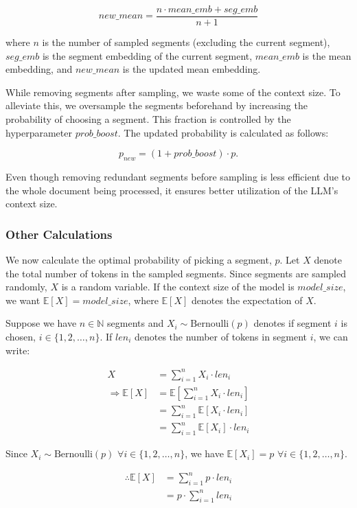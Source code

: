 \[ new\_mean = \frac{n \cdot mean\_emb + seg\_emb}{n + 1} \]

\noindent where $n$ is the number of sampled segments (excluding the current segment), $seg\_emb$ is the segment embedding of the current segment, $mean\_emb$ is the mean embedding, and $new\_mean$ is the updated mean embedding.

While removing segments after sampling, we waste some of the context size.
To alleviate this, we oversample the segments beforehand by increasing the probability of choosing a segment.
This fraction is controlled by the hyperparameter $prob\_boost$.
The updated probability is calculated as follows:

\[ p_{new} = (1 + prob\_boost) \cdot p. \]

Even though removing redundant segments before sampling is less efficient due to the whole document being processed, it ensures better utilization of the LLM's context size.

\subsubsection*{Other Calculations}

We now calculate the optimal probability of picking a segment, $p$.
Let $X$ denote the total number of tokens in the sampled segments.
Since segments are sampled randomly, $X$ is a random variable.
If the context size of the model is $model\_size$, we want $\mathbb{E}[X] = model\_size$, where $\mathbb{E}[X]$ denotes the expectation of $X$.

Suppose we have $n \in \mathbb{N}$ segments and $X_i \sim \mathrm{Bernoulli}(p)$ denotes if segment $i$ is chosen, $i \in \{1, 2, \dots, n\}$.
If $len_i$ denotes the number of tokens in segment $i$, we can write:

\begin{align*}
  X &= \sum_{i = 1}^{n} X_i \cdot len_i \\
  \Rightarrow \mathbb{E}[X] &= \mathbb{E}\left[\sum_{i = 1}^{n} X_i \cdot len_i\right] \\
  &= \sum_{i = 1}^{n} \mathbb{E}[X_i \cdot len_i] \\
  &= \sum_{i = 1}^{n} \mathbb{E}[X_i] \cdot len_i
\end{align*}

Since $X_i \sim \mathrm{Bernoulli}(p)$ $\forall i \in \{1, 2, \dots, n\}$, we have $\mathbb{E}[X_i] = p$ $\forall i \in \{1, 2, \dots, n\}$.

\begin{align*}
  \therefore \mathbb{E}[X] &= \sum_{i = 1}^{n} p \cdot len_i \\
  &= p \cdot \sum_{i = 1}^{n} len_i
\end{align*}

